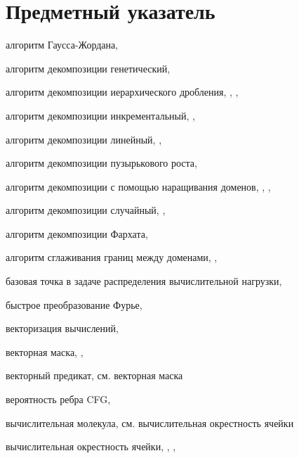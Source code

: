 \newpage

\section*{Предметный указатель}

алгоритм Гаусса-Жордана, \pageref{term:alg_gauss_zhordan}

алгоритм декомпозиции генетический, \pageref{term:alg_decomp_gen}

алгоритм декомпозиции иерархического дробления, \pageref{term:alg_decomp_hierarch}, \pageref{term:alg_decomp_hierarch2}, \pageref{term:alg_decomp_hierarch3}

алгоритм декомпозиции инкрементальный, \pageref{term:alg_decomp_inc}, \pageref{term:alg_decomp_inc2}

алгоритм декомпозиции линейный, \pageref{term:alg_decomp_linear}, \pageref{term:alg_decomp_linear2}

алгоритм декомпозиции пузырькового роста, \pageref{term:alg_decomp_bubble}

алгоритм декомпозиции с помощью наращивания доменов, \pageref{term:alg_decomp_rgrow}, \pageref{term:alg_decomp_rgrow2}, \pageref{term:alg_decomp_rgrow3}

алгоритм декомпозиции случайный, \pageref{term:alg_decomp_random}, \pageref{term:alg_decomp_random2}

алгоритм декомпозиции Фархата, \pageref{term:alg_decomp_farhat}

алгоритм сглаживания границ между доменами, \pageref{term:alg_smooth_domains_border}, \pageref{term:alg_smooth_domains_border2}

базовая точка в задаче распределения вычислительной нагрузки, \pageref{term:distr_base_point}

быстрое преобразование Фурье, \pageref{term:furier_transform}

векторизация вычислений, \pageref{term:vectorization}

векторная маска, \pageref{term:vector_mask}, \pageref{term:vector_mask2}

векторный предикат, см. векторная маска

вероятность ребра CFG, \pageref{term:edge_prob}

вычислительная молекула, см. вычислительная окрестность ячейки

вычислительная окрестность ячейки, \pageref{term:cell_calc_template}, \pageref{term:cell_calc_template2}, \pageref{term:cell_calc_template3}

